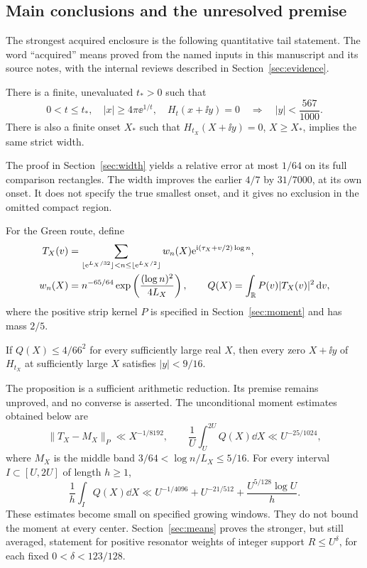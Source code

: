 \subsection{Main conclusions and the unresolved premise}

The strongest acquired enclosure is the following quantitative tail
statement. The word ``acquired'' means proved from the named inputs in
this manuscript and its source notes, with the internal reviews described
in Section~\ref{sec:evidence}.

\begin{theorem}\label{thm:main-width}
There is a finite, unevaluated $t_*>0$ such that
\[
 0<t\le t_*,\quad |x|\ge4\pi\ee^{1/t},\quad H_t(x+\ii y)=0
 \quad\Longrightarrow\quad |y|<\frac{567}{1000}.
\]
There is also a finite onset $X_*$ such that
$H_{t_X}(X+\ii y)=0$, $X\ge X_*$, implies the same strict width.
\end{theorem}

The proof in Section~\ref{sec:width} yields a relative error at most
$1/64$ on its full comparison rectangles. The width improves the
earlier $4/7$ by $31/7000$, at its own onset. It does not specify the
true smallest onset, and it gives no exclusion in the omitted compact
region.

For the Green route, define
\begin{equation}\label{eq:raw-tail-intro}
 \begin{split}
 T_X(v)&=\sum_{\lfloor\mathrm e^{L_X/32}\rfloor<n\le
                    \lfloor\mathrm e^{L_X/2}\rfloor}
 w_n(X)\mathrm e^{\mathrm i(\tau_X+v/2)\log n},\\
 w_n(X)&=n^{-65/64}\exp\left(\frac{(\log n)^2}{4L_X}\right),\qquad
 Q(X)=\int_\mathbb R P(v)|T_X(v)|^2\,\mathrm d v,
 \end{split}
\end{equation}
where the positive strip kernel $P$ is specified in
Section~\ref{sec:moment} and has mass $2/5$.

\begin{proposition}\label{prop:intro-green}
If $Q(X)\le4/66^2$ for every sufficiently large real $X$, then every
zero $X+\ii y$ of $H_{t_X}$ at sufficiently large $X$ satisfies
$|y|<9/16$.
\end{proposition}

The proposition is a sufficient arithmetic reduction. Its premise
remains unproved, and no converse is asserted. The unconditional
moment estimates obtained below are
\[
 \|T_X-M_X\|_P\ll X^{-1/8192},\qquad
 \frac1U\int_U^{2U}Q(X)\dd X\ll U^{-25/1024},
\]
where $M_X$ is the middle band $3/64<\log n/L_X\le5/16$.
For every interval $I\subset[U,2U]$ of length $h\ge1$,
\[
 \frac1h\int_I Q(X)\dd X
 \ll U^{-1/4096}+U^{-21/512}+\frac{U^{5/128}\log U}{h}.
\]
These estimates become small on specified growing windows. They do not
bound the moment at every center. Section~\ref{sec:means} proves the
stronger, but still averaged, statement for positive resonator weights
of integer support $R\le U^\delta$, for each fixed $0<\delta<123/128$.

